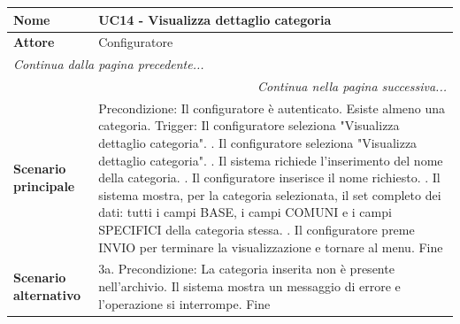 \documentclass[12pt, a4paper, oneside]{report}
\begin{document}
\renewcommand{\arraystretch}{1.4} 

\begin{tabularx}{\textwidth}{|l|X|}
    \hline
    \textbf{Nome}               & \textbf{UC14 - Visualizza dettaglio categoria} \\ \hline
    \textbf{Attore}             & Configuratore \\ \hline
    \endfirsthead 

    \hline
    \multicolumn{2}{|l|}{\textit{Continua dalla pagina precedente...}} \\ \hline
    \endhead 

    \hline
    \multicolumn{2}{|r|}{\textit{Continua nella pagina successiva...}} \\ \hline
    \endfoot 

    \hline
    \endlastfoot

    \textbf{Scenario principale} & 
    Precondizione: Il configuratore è autenticato. Esiste almeno una categoria. \newline
    Trigger: Il configuratore seleziona "Visualizza dettaglio categoria". \newline
    1. Il configuratore seleziona "Visualizza dettaglio categoria". \newline
    2. Il sistema richiede l'inserimento del nome della categoria. \newline
    3. Il configuratore inserisce il nome richiesto. \newline
    4. Il sistema mostra, per la categoria selezionata, il set completo dei dati: tutti i campi BASE, i campi COMUNI e i campi SPECIFICI della categoria stessa. \newline
    5. Il configuratore preme INVIO per terminare la visualizzazione e tornare al menu. \newline
    Fine \\ \hline
    
    \textbf{Scenario alternativo} & 
    3a. Precondizione: La categoria inserita non è presente nell'archivio. \newline
    Il sistema mostra un messaggio di errore e l'operazione si interrompe. \newline
    Fine \\ \hline
\end{tabularx}
\end{document}
